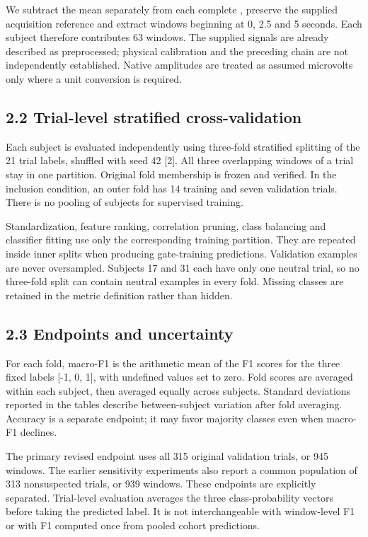 \documentclass[10pt,a4paper]{article}
\begin{document}
We subtract the mean separately from each complete , preserve the supplied acquisition reference and extract windows beginning at 0, 2.5 and 5 seconds. Each subject therefore contributes 63 windows. The supplied signals are already described as preprocessed; physical calibration and the preceding  chain are not independently established. Native amplitudes are treated as assumed microvolts only where a unit conversion is required.


\subsection*{2.2 Trial-level stratified cross-validation}

Each subject is evaluated independently using three-fold stratified splitting of the 21 trial labels, shuffled with seed 42 [2]. All three overlapping windows of a trial stay in one partition. Original fold membership is frozen and verified. In the inclusion condition, an outer fold has 14 training and seven validation trials. There is no pooling of subjects for supervised training.


Standardization, feature ranking, correlation pruning, class balancing and classifier fitting use only the corresponding training partition. They are repeated inside inner splits when producing gate-training predictions. Validation examples are never oversampled. Subjects 17 and 31 each have only one neutral trial, so no three-fold split can contain neutral examples in every fold. Missing classes are retained in the metric definition rather than hidden.


\subsection*{2.3 Endpoints and uncertainty}

For each fold, macro-F1 is the arithmetic mean of the F1 scores for the three fixed labels [-1, 0, 1], with undefined values set to zero. Fold scores are averaged within each subject, then averaged equally across subjects. Standard deviations reported in the tables describe between-subject variation after fold averaging. Accuracy is a separate endpoint; it may favor majority classes even when macro-F1 declines.


The primary revised endpoint uses all 315 original validation trials, or 945 windows. The earlier sensitivity experiments also report a common population of 313 nonsuspected trials, or 939 windows. These endpoints are explicitly separated. Trial-level evaluation averages the three class-probability vectors before taking the predicted label. It is not interchangeable with window-level F1 or with F1 computed once from pooled cohort predictions.
\end{document}
